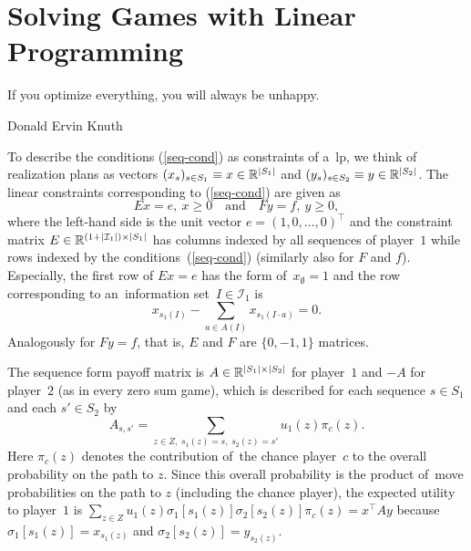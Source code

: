 \section{Solving Games with Linear Programming}
{
  \setlength{\epigraphwidth}{0.65\textwidth}
  \epigraph{
    If you optimize everything, you will always be unhappy.
  }{Donald Ervin Knuth}
}%
To describe the conditions (\ref{seq-cond}) as constraints of a~\acrfull{lp}, we think of realization plans as vectors
$(x_s) _{s\in S_1} \equiv x \in \mathbb{R} ^{\left\vert S_1 \right\vert}$
and
$(y_s) _{s\in S_2} \equiv y \in \mathbb{R} ^{\left\vert S_2 \right\vert}$.
The linear constraints corresponding to (\ref{seq-cond}) are given as
\begin{equation}
\label{seq-constr}
    Ex = e, \ x \ge 0
    \quad \textrm{and} \quad
    Fy = f, \ y \ge 0,
\end{equation}
where the left-hand side is the unit vector $e = (1, 0, \dots, 0) ^\top$ and the constraint matrix
$E \in \mathbb{R} ^{(1 + \left\vert \mathcal{I}_1 \right\vert) \times \left\vert S_1 \right\vert}$
has columns indexed by all sequences of player~$1$ while rows indexed by the conditions~(\ref{seq-cond}) (similarly also for $F$ and $f$).
Especially, the first row of $Ex = e$ has the form of~$x _{\emptyset} = 1$ and the row corresponding to an~information set~$I \in \mathcal{I}_1$ is
\[
    x _{s_1 (I)} - \sum _{a \in A(I)} x _{s_1(I \cdot a)} = 0.
\]
Analogously for $Fy = f$, that is, $E$ and $F$ are $\{0, -1, 1\}$ matrices.

The sequence form payoff matrix is $A \in \mathbb{R} ^{\left\vert S_1 \right\vert \times \left\vert S_2 \right\vert}$ for player~$1$ and $-A$ for player~$2$ (as in every zero sum game), which is described for each sequence $s \in S_1$ and each $s' \in S_2$ by
\[
    A _{s,s'} = \sum _{z \in Z,\; s_1(z) = s,\; s_2(z) = s'} u_1(z) \pi_c (z).
\]
Here $\pi_c (z)$ denotes the contribution of~the chance player~$c$ to the overall probability on the path to $z$.
Since this overall probability is the product of~move probabilities on the path to $z$ (including the chance player), the expected utility to player~$1$ is
$
    \sum _{z \in Z} u_1(z) \sigma_1 [s_1(z)] \sigma_2 [s_2(z)] \pi_c (z)
    = x ^\top A y
$
because $\sigma_1 [s_1(z)] = x _{s_1(z)}$ and $\sigma_2 [s_2(z)] = y _{s_2(z)}$.

